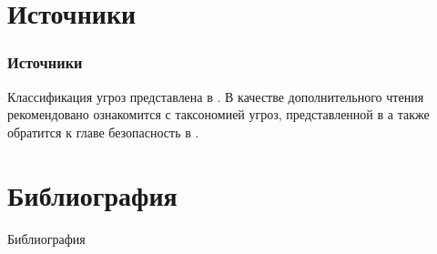 \section{Источники}

\begin{frame}
    \frametitle{Источники}
    
    Классификация угроз представлена в \cite{bib:shangin:protect,bib:chmora:crypto,bib:yaroch:infsec}. В качестве дополнительного чтения рекомендовано ознакомится с таксономией угроз, представленной в \cite{bib:zegzda:secbase} а также обратится к главе безопасность в \cite{bib:tannen:os}.
\end{frame}


\section{Библиография}

\begin{frame}[allowframebreaks]{Библиография}
    
    
\end{frame}





